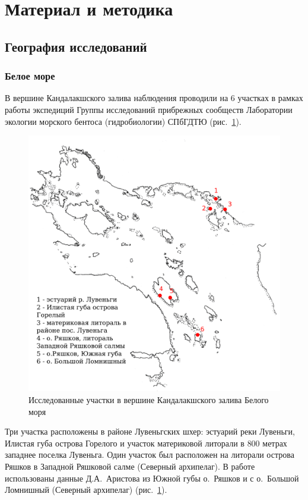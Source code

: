 \section{Материал и методика}
	\subsection{География исследований}

		\subsubsection{Белое море}
В вершине Кандалакшского залива наблюдения проводили на $6$ участках в рамках работы экспедиций Группы исследований прибрежных сообществ Лаборатории экологии морского бентоса (гидробиологии) СПбГДТЮ (рис.~\ref{ris:karta_Kandalaksha}). 
    \begin{figure}
    \includegraphics[width=\textwidth]{../maps/map_Kandalaksha.pdf}
    \caption{Исследованные участки в вершине Кандалакшского залива Белого моря}
    \label{ris:karta_Kandalaksha}
    \end{figure}
Три участка расположены в районе Лувеньгских шхер: эстуарий реки Лувеньги, Илистая губа острова Горелого и участок материковой литорали в $800$ метрах западнее поселка Лувеньга.
Один участок был расположен на литорали острова Ряшков в Западной Ряшковой салме (Северный архипелаг).
В работе использованы данные Д.\:А.~Аристова из Южной губы о.~Ряшков и с о.~Большой Ломнишный (Северный архипелаг) (рис.~\ref{ris:karta_Kandalaksha}). 

